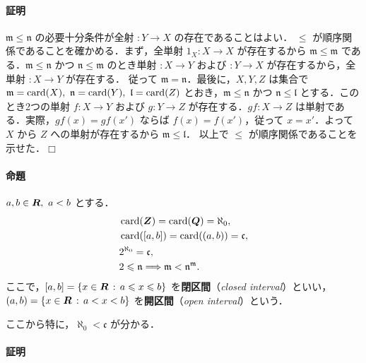 \documentclass[pandoc,base=10pt,b5j,precisetext]{bxjsarticle}
\let\oldparagraph\paragraph
\renewcommand{\paragraph}[1]{\oldparagraph{#1}\mbox{}}
\def\lt{<}
\begin{document}
\hypertarget{ux8a3cux660e-1}{%
\paragraph{証明}\label{ux8a3cux660e-1}}

\(\mathfrak m \le \mathfrak n\) の必要十分条件が全射 \(\colon Y \to X\)
の存在であることはよい． \(\le\)
が順序関係であることを確かめる．まず，全単射 \(1_X \colon X \to X\)
が存在するから \(\mathfrak m \le \mathfrak m\)
である．\(\mathfrak m \le \mathfrak n\) かつ
\(\mathfrak n \le \mathfrak m\) のとき単射 \(\colon X \to Y\) および
\(\colon Y \to X\) が存在するから，全単射 \(\colon X \to Y\)
が存在する． 従って \(\mathfrak m = \mathfrak n\)．最後に，\(X, Y, Z\)
は集合で
\(\mathfrak m = \mathop{\mathrm{card}}\nolimits(X),\ \mathfrak n = \mathop{\mathrm{card}}\nolimits(Y),\ \mathfrak l = \mathop{\mathrm{card}}\nolimits(Z)\)
とおき，\(\mathfrak m \le \mathfrak n\) かつ
\(\mathfrak n \le \mathfrak l\) とする．このとき2つの単射
\(f \colon X \to Y\) および \(g \colon Y \to Z\)
が存在する．\(gf \colon X \to Z\) は単射である．実際，\(gf(x) = gf(x')\)
ならば \(f(x) = f(x')\)，従って \(x = x'\)．よって \(X\) から \(Z\)
への単射が存在するから \(\mathfrak m \le \mathfrak l\)． 以上で \(\le\)
が順序関係であることを示せた．\(\Box\)

\hypertarget{ux547dux984c}{%
\paragraph{命題}\label{ux547dux984c}}

\(a, b \in \bb R,\ a \lt b\) とする． \begin{align}
&\card(\bb Z) = \card(\bb Q) = \aleph_0,\\
&\card([a, b]) = \card((a, b)) = \mathfrak c,\\
&2^{\aleph_0} = \mathfrak c,\\
&2 \le \mathfrak n \Longrightarrow \mathfrak m \lt \mathfrak n^{\mathfrak m}.
\end{align} ここで，\([a,b] = \{ x \in \boldsymbol{R} \,:\, a \leqslant x \leqslant b \}\)
を\textbf{閉区間}（\emph{closed
interval}）といい，\((a, b) = \{ x \in \bb R \deli a \lt x \lt b \}\)
を\textbf{開区間}（\emph{open interval}）という．

ここから特に，\(\aleph_0 \lt \mathfrak c\) が分かる．

\hypertarget{ux8a3cux660e-2}{%
\paragraph{証明}\label{ux8a3cux660e-2}}
\end{document}
